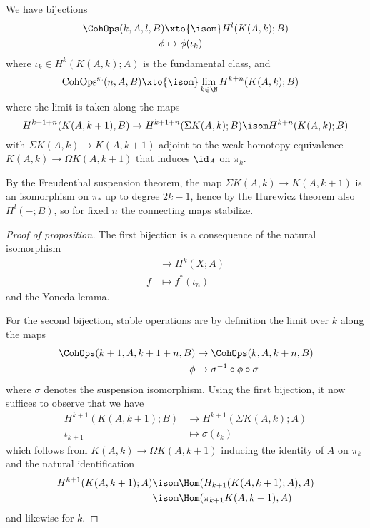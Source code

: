 \begin{proposition}\label{prp:cohopsbijections}
	We have bijections
	\begin{align*}
		\CohOps(k, A, l, B) &\xto{\isom} H^l(K(A, k); B) \\
		\phi &\mapsto \phi(\iota_k)
	\end{align*}
	where $\iota_k \in H^k(K(A, k); A)$ is the fundamental class, and
	\begin{align*}
		\CohOpsst(n, A, B) &\xto{\isom} \lim_{k \in \N} H^{k + n}(K(A, k); B)
	\end{align*}
	where the limit is taken along the maps
	\begin{equation*}
		H^{k + 1 + n}(K(A, k + 1), B) \to H^{k + 1 + n}(\Sigma K(A, k); B) \isom H^{k + n}(K(A, k); B)
	\end{equation*}
	with $\Sigma K(A, k) \to K(A, k + 1)$ adjoint to the weak homotopy equivalence $K(A, k) \to \Omega K(A, k + 1)$ that induces $\id_A$ on $\pi_k$.
\end{proposition}
\begin{remark}
	By the Freudenthal suspension theorem, the map $\Sigma K(A, k) \to K(A, k + 1)$ is an isomorphism on $\pi_*$ up to degree $2k - 1$, hence by the Hurewicz theorem also $H^l({{-}}; B)$, so for fixed $n$ the connecting maps stabilize.
\end{remark}
\begin{proof}[Proof of proposition]
	The first bijection is a consequence of the natural isomorphism
	\begin{align*}
		[X, K(A, k)] &\to H^k(X; A) \\
		f &\mapsto f^*(\iota_n)
	\end{align*}
	and the Yoneda lemma.

	For the second bijection, stable operations are by definition the limit over $k$ along the maps
	\begin{align*}
		\CohOps(k + 1, A, k + 1 + n, B) &\to \CohOps(k, A, k + n, B) \\
		\phi &\mapsto \sigma^{-1} \circ \phi \circ \sigma
	\end{align*}
	where $\sigma$ denotes the suspension isomorphism.
	Using the first bijection, it now suffices to observe that we have
	\begin{align*}
		H^{k + 1}(K(A, k + 1); B) &\to H^{k + 1}(\Sigma K(A, k); A) \\
		\iota_{k + 1} &\mapsto \sigma(\iota_k)
	\end{align*}
	which follows from $K(A, k) \to \Omega K(A, k + 1)$ inducing the identity of $A$ on $\pi_k$ and the natural identification
	\begin{align*}
		H^{k + 1}(K(A, k + 1); A) &\isom \Hom(H_{k + 1}(K(A, k + 1); A), A) \\ 
								  &\isom \Hom(\pi_{k + 1} K(A, k + 1), A)
	\end{align*}
	and likewise for $k$.
\end{proof}
